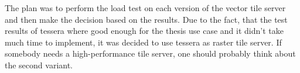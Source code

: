 \begin{tcolorbox}[arc=0mm,boxrule=1pt,title=Decision]\label{tile_server_decision}
The plan was to perform the load test on each version of the vector tile server and then make the decision based on the results. Due to the fact, that the test results of tessera where good enough for the thesis use case and it didn't take much time to implement, it was decided to use tessera as raster tile server.
If somebody needs a high-performance tile server, one should probably think about the second variant.
\end{tcolorbox}